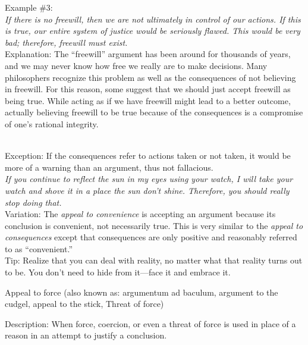 \documentclass[a4paper,12pt,single,pdftex]{scrartcl}
\begin{document}
{    
      Example \#3:
    \\

    
      {\em If there is no freewill, then we are not ultimately in control of our actions. If this is true, our entire system of justice would be seriously flawed. This would be very bad; therefore, freewill must exist.}
    \\

    
      Explanation: The “freewill” argument has been around for thousands of years, and we may never know how free we really are to make decisions. Many philosophers recognize this problem as well as the consequences of not believing in freewill. For this reason, some suggest that we should just accept freewill as being true. While acting as if we have freewill might lead to a better outcome, actually believing freewill to be true because of the consequences is a compromise of one’s rational integrity. \newline

    \\

    
      Exception: If the consequences refer to actions taken or not taken, it would be more of a warning than an argument, thus not fallacious.
    \\

    
      {\em If you continue to reflect the sun in my eyes using your watch, I will take your watch and shove it in a place the sun don’t shine. Therefore, you should really stop doing that.}
    \\

    
      Variation: The {\em appeal to convenience} is accepting an argument because its conclusion is convenient, not necessarily true. This is very similar to the {\em appeal to consequences} except that consequences are only positive and reasonably referred to as “convenient.”
    \\

    
      Tip: Realize that you can deal with reality, no matter what that reality turns out to be.  You don’t need to hide from it—face it and embrace it.
    \\

  }


Appeal to force
    (also known as: argumentum ad baculum, argument to the cudgel, appeal to the stick, Threat of force)
  
    Description:  When force, coercion, or even a threat of force is used in place of a reason in an attempt to justify a conclusion.
\end{document}

